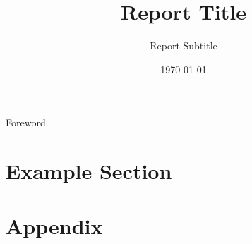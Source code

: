 \documentclass{general_report}
\title{Report Title}
\subtitle{Report Subtitle}
\date{\today}
\begin{document}
\frontmatter

\begin{foreword}
  Foreword.
\end{foreword}

\tableofcontents
\clearpage

\pagestyle{fancy} %
\fancyhf{}
\fancyfoot[C]{\thepage} %
\setcounter{page}{1}

\section{Example Section}


\clearpage
\appendix
\section{Appendix}

\clearpage
\printbibliography
\end{document}

